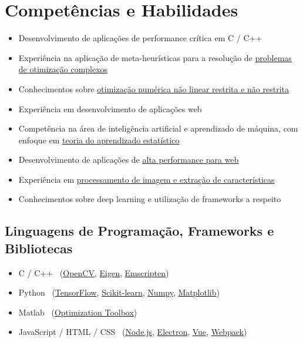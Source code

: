 \section{Competências e Habilidades}

\begin{itemize}
    \item Desenvolvimento de aplicações de performance crítica em C / C++
    
    \item Experiência na aplicação de meta-heurísticas para a resolução de \hyperref[C-ITGO]{problemas de otimização complexos}

    \item Conhecimentos sobre \hyperref[nlpp]{otimização numérica não linear restrita e não restrita}

    \item Experiência em desenvolvimento de aplicações web

    \item Competência na área de inteligência artificial e aprendizado de máquina, com enfoque em \hyperref[mlpp]{teoria do aprendizado estatístico}

    \item Desenvolvimento de aplicações de \hyperref[js-nlp]{alta performance para web}

    \item Experiência em \hyperref[jseg]{processamento de imagem e extração de características}

    \item Conhecimentos sobre deep learning e utilização de frameworks a respeito

\end{itemize}



\subsection*{Linguagens de Programação, Frameworks e Bibliotecas}

\begin{itemize}
    \item C / C++ \ (\href{https://opencv.org/}{OpenCV},  \href{http://eigen.tuxfamily.org/index.php?title=Main_Page}{Eigen}, \href{https://kripken.github.io/emscripten-site/}{Emscripten})
    \item Python \ (\href{https://www.tensorflow.org/}{TensorFlow}, \href{http://scikit-learn.org/stable/index.html}{Scikit-learn}, \href{http://www.numpy.org/}{Numpy}, \href{https://matplotlib.org/}{Matplotlib})
    \item Matlab \ (\href{https://www.mathworks.com/products/optimization.html}{Optimization Toolbox})
    \item JavaScript / HTML / CSS \ (\href{https://nodejs.org/en/}{Node.js}, \href{https://electronjs.org/}{Electron}, \href{https://vuejs.org/}{Vue}, \href{https://webpack.js.org/}{Webpack})
\end{itemize}

\vspace{0.5cm}
